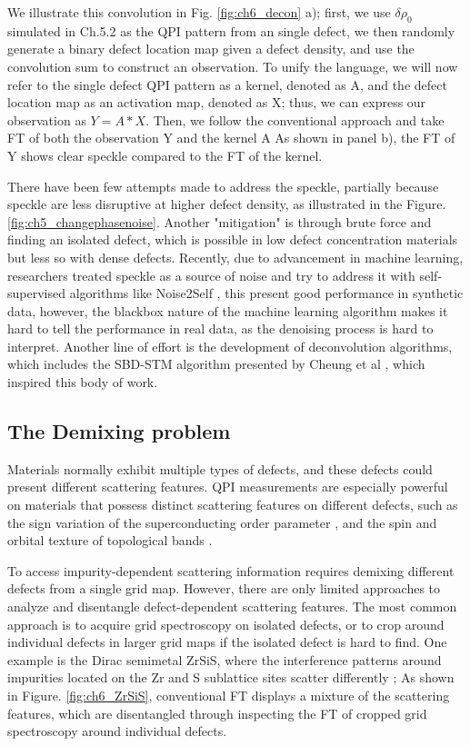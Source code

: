 We illustrate this convolution in Fig. \ref{fig:ch6_decon} a); first, we use $\delta \rho_0$ simulated in Ch.5.2 as the \ac{QPI} pattern from an single defect, we then randomly generate a binary defect location map given a defect density, and use the convolution sum to construct an observation. To unify the language, we will now refer to the single defect \ac{QPI} pattern as a kernel, denoted as A, and the defect location map as an activation map, denoted as X; thus, we can express our observation as $Y = A * X$. Then, we follow the conventional approach and take \ac{FT} of both the observation Y and the kernel A As shown in panel b), the \ac{FT} of Y shows clear speckle compared to the \ac{FT} of the kernel.

There have been few attempts made to address the speckle, partially because speckle are less disruptive at higher defect density, as illustrated in the Figure. \ref{fig:ch5_changephasenoise}. Another "mitigation" is through brute force and finding an isolated defect, which is possible in low defect concentration materials but less so with dense defects. Recently, due to advancement in machine learning, researchers treated speckle as a source of noise and try to address it with self-supervised algorithms like Noise2Self \cite{kuijfSelfsupervisedLearningDenoising2025}, this present good performance in synthetic data, however, the blackbox nature of the machine learning algorithm makes it hard to tell the performance in real data, as the denoising process is hard to interpret. Another line of effort is the development of deconvolution algorithms, which includes the SBD-STM algorithm presented by Cheung et al \cite{cheungDictionaryLearningFouriertransform2020}, which inspired this body of work.
 

\subsection{The Demixing problem}
Materials normally exhibit multiple types of defects, and these defects could present different scattering features. QPI measurements are especially powerful on materials that possess distinct scattering features on different defects, such as the sign variation of the superconducting order parameter \cite{chiSignInversionSuperconducting2014}, and the spin and orbital texture of topological bands \cite{yinProbingTopologicalQuantum2021}\cite{butlerQuasiparticleInterferenceZrSiS2017}. 

To access impurity-dependent scattering information requires demixing different defects from a single grid map. However, there are only limited approaches to analyze and disentangle defect-dependent scattering features. The most common approach is to acquire grid spectroscopy on isolated defects, or to crop around individual defects in larger grid maps if the isolated defect is hard to find. One example is the Dirac semimetal ZrSiS, where the interference patterns around impurities located on the Zr and S sublattice sites scatter differently \cite{butlerQuasiparticleInterferenceZrSiS2017}; As shown in Figure. \ref{fig:ch6_ZrSiS}, conventional \ac{FT} displays a mixture of the scattering features, which are disentangled through inspecting the \ac{FT} of cropped grid spectroscopy around individual defects. 

